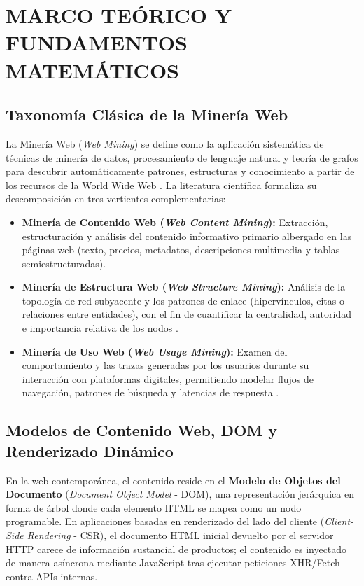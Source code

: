 \section{MARCO TEÓRICO Y FUNDAMENTOS MATEMÁTICOS}

\subsection{Taxonomía Clásica de la Minería Web}
La Minería Web (\textit{Web Mining}) se define como la aplicación sistemática de técnicas de minería de datos, procesamiento de lenguaje natural y teoría de grafos para descubrir automáticamente patrones, estructuras y conocimiento a partir de los recursos de la World Wide Web \citep{liu2011web, han2012data}. La literatura científica formaliza su descomposición en tres vertientes complementarias:

\begin{itemize}[leftmargin=*]
    \item \textbf{Minería de Contenido Web (\textit{Web Content Mining}):} Extracción, estructuración y análisis del contenido informativo primario albergado en las páginas web (texto, precios, metadatos, descripciones multimedia y tablas semiestructuradas).
    \item \textbf{Minería de Estructura Web (\textit{Web Structure Mining}):} Análisis de la topología de red subyacente y los patrones de enlace (hipervínculos, citas o relaciones entre entidades), con el fin de cuantificar la centralidad, autoridad e importancia relativa de los nodos \citep{chakrabarti2002mining}.
    \item \textbf{Minería de Uso Web (\textit{Web Usage Mining}):} Examen del comportamiento y las trazas generadas por los usuarios durante su interacción con plataformas digitales, permitiendo modelar flujos de navegación, patrones de búsqueda y latencias de respuesta \citep{srivastava2000web}.
\end{itemize}

\subsection{Modelos de Contenido Web, DOM y Renderizado Dinámico}
En la web contemporánea, el contenido reside en el \textbf{Modelo de Objetos del Documento} (\textit{Document Object Model} - DOM), una representación jerárquica en forma de árbol donde cada elemento HTML se mapea como un nodo programable. En aplicaciones basadas en renderizado del lado del cliente (\textit{Client-Side Rendering} - CSR), el documento HTML inicial devuelto por el servidor HTTP carece de información sustancial de productos; el contenido es inyectado de manera asíncrona mediante JavaScript tras ejecutar peticiones XHR/Fetch contra APIs internas.

